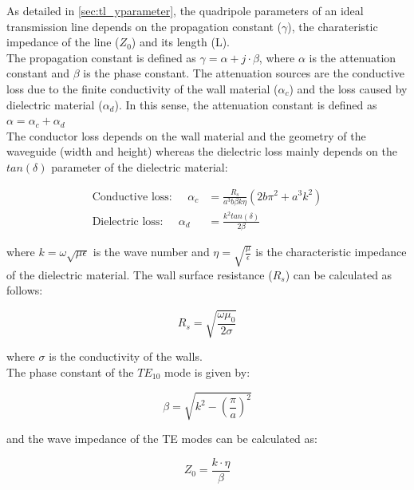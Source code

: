 \noindent As detailed in \ref{sec:tl_yparameter}, the quadripole parameters of an ideal transmission line depends on the propagation constant ($\gamma$), the charateristic impedance of the line ($Z_0$) and its length (L). \\ 

The propagation constant is defined as $\gamma = \alpha + j \cdot \beta$, where $\alpha$ is the attenuation constant and $\beta$ is the phase constant. The attenuation sources are the conductive loss due to the finite conductivity of the wall material ($\alpha_c$) and the loss caused by dielectric material ($\alpha_d$). In this sense, the attenuation constant is defined as $\alpha = \alpha_c + \alpha_d$\\

\noindent The conductor loss depends on the wall material and the geometry of the waveguide (width and height) whereas the dielectric loss mainly depends on the $tan (\delta)$ parameter of the dielectric material:

\begin{align}
    \text{Conductive loss:} \;\;\;\;\; \alpha_c & = \frac{R_s}{a^3 b \beta k \eta} (2b\pi^2 + a^3k^2) \\
    \text{Dielectric loss:} \;\;\;\;\;\alpha_d & = \frac{k^2 tan (\delta)}{2 \beta}
\end{align} 

\noindent where $k = \omega \sqrt{\mu \epsilon}$ is the wave number and $\eta = \sqrt{\frac{\mu}{\epsilon}}$ is the characteristic impedance of the dielectric material. The wall surface resistance ($R_s$) can be calculated as follows:

\begin{equation}
R_s = \sqrt{\frac{\omega \mu_0}{2 \sigma}}
\label{eq:WG_wallRs}
\end{equation}

\noindent where $\sigma$ is the conductivity of the walls.\\

\noindent The phase constant of the $TE_{10}$ mode is given by:

\begin{equation}
\beta  = \sqrt{k^2 - \left( \frac{\pi}{a}\right)^2}
\end{equation}

\noindent and the wave impedance of the TE modes can be calculated as:

\begin{equation}
Z_0 = \frac{k \cdot \eta}{\beta}
\end{equation}

